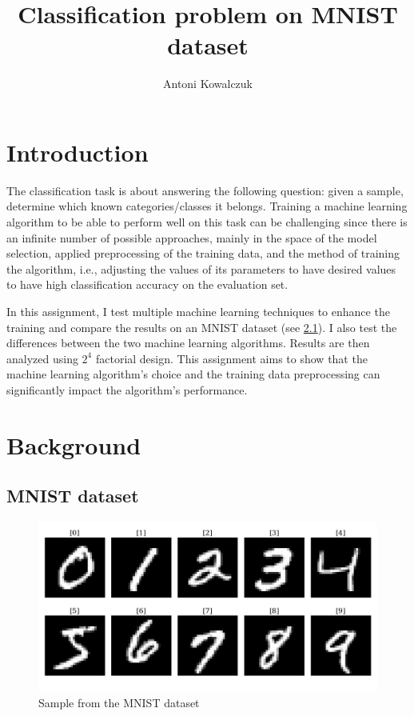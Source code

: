 \documentclass{article}
\title{Classification problem on MNIST dataset}
\author{
  Antoni Kowalczuk
}
\begin{document}
\maketitle

\section{Introduction}
The classification task is about answering the following question: given a sample, determine which known categories/classes it belongs. Training a machine learning algorithm to be able to perform well on this task can be challenging since there is an infinite number of possible approaches, mainly in the space of the model selection, applied preprocessing of the training data, and the method of training the algorithm, i.e., adjusting the values of its parameters to have desired values to have high classification accuracy on the evaluation set.

In this assignment, I test multiple machine learning techniques to enhance the training and compare the results on an MNIST dataset (see \ref{subsec:mnist}). I also test the differences between the two machine learning algorithms. Results are then analyzed using $2^4$ factorial design. This assignment aims to show that the machine learning algorithm's choice and the training data preprocessing can significantly impact the algorithm's performance.

\section{Background}

\subsection{MNIST dataset}
\label{subsec:mnist}

\begin{figure}[ht]
    \centering
    \includegraphics[width=\textwidth]{mnist.png}
    \caption{Sample from the MNIST dataset}
    \label{fig:mnist_sample}
\end{figure}
\end{document}
